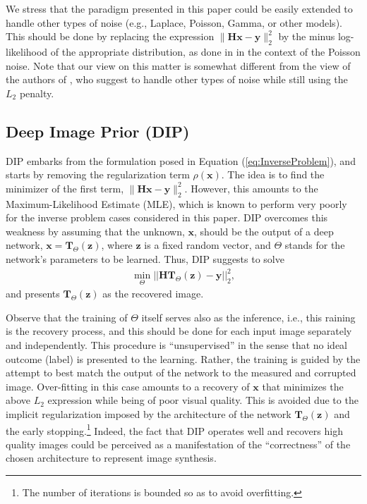 \documentclass[12pt]{article}
\def\x{{\mathbf x}}
\def\H{{\mathbf H}}
\def\y{{\mathbf y}}
\def\z{{\mathbf z}}
\def\T{{\mathbf T}}
\begin{document}
\noindent We stress that the paradigm presented in this paper could be easily extended to handle other types of noise (e.g., Laplace, Poisson, Gamma, or other models). This should be done by replacing the expression $\|\H\x-\y\|_2^2$ by the minus log-likelihood of the appropriate distribution, as done in \cite{PoissonDenoising-2014,PoissonIP-2016, giryes2014sparsity} in the context of the Poisson noise. Note that our view on this matter is somewhat different from the view of the authors of \cite{DIP-2018}, who suggest to handle other types of noise while still using the $L_2$ penalty. 



\subsection{Deep Image Prior (DIP)}
\label{subsec:DIP}

DIP embarks from the formulation posed in Equation (\ref{eq:InverseProblem}), and starts by removing the regularization term $\rho(\x)$. The idea is to find the minimizer of the first term, $\|\H \x - \y\|_2^2$. However, this amounts to the  Maximum-Likelihood Estimate (MLE), which is known to perform very poorly for the inverse problem cases considered in this paper. DIP overcomes this weakness by assuming that the unknown, $\x$, should be the output of a deep network, $\x=\T_{\Theta}(\z)$, where $\z$ is a fixed random vector, and $\Theta$ stands for the network's parameters to be learned. Thus, DIP suggests to solve 
\begin{eqnarray}
\min_{\Theta} ||\H \T_{\Theta}(\z)-\y||^2_2, 
\end{eqnarray}
and presents $\T_{\Theta}(\z)$ as the recovered image. 

Observe that the training of $\Theta$ itself serves also as the inference, i.e., this raining is the recovery process, and this should be done for each input image separately and independently. This procedure is ``unsupervised'' in the sense that no ideal outcome (label) is presented to the learning. Rather, the training is guided by the attempt to best match the output of the network to the measured and corrupted image. Over-fitting in this case amounts to a recovery of $\x$ that minimizes the above $L_2$ expression while being of poor visual quality. This is avoided due to the implicit regularization imposed by the architecture of the network $\T_{\Theta}(\z)$ and the early stopping.\footnote{The number of iterations is bounded so as to avoid overfitting.} Indeed, the fact that DIP operates well and recovers high quality images could be perceived as a manifestation of the ``correctness'' of the chosen architecture to represent  image synthesis. 
\end{document}
